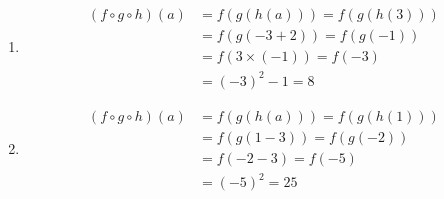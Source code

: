 \begin{exercise}{9}
  \begin{enumerate}
    \item \begin{align*}
            (f \circ g \circ h)(a) &= f(g(h(a))) = f(g(h(3))) \\
                                   &= f(g(-3+2)) = f(g(-1)) \\
                                   &= f(3 \times (-1)) = f(-3) \\
                                   &= (-3)^2-1 = 8
          \end{align*}
    \item \begin{align*}
            (f \circ g \circ h)(a) &= f(g(h(a))) = f(g(h(1))) \\
                                   &= f(g(1-3)) = f(g(-2)) \\
                                   &= f(-2-3) = f(-5) \\
                                   &= (-5)^2 = 25
          \end{align*}
  \end{enumerate}
\end{exercise}
